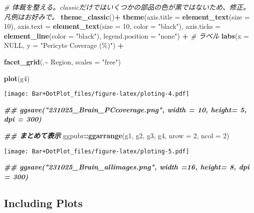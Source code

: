 \documentclass[
  a4paper,
  number-of-lines=30,
  textwidth=40zw]{bxjsarticle}
\newenvironment{Shaded}{\begin{snugshade}}{\end{snugshade}}
\newcommand{\AttributeTok}[1]{\textcolor[rgb]{0.13,0.29,0.53}{#1}}
\newcommand{\CommentTok}[1]{\textcolor[rgb]{0.56,0.35,0.01}{\textit{#1}}}
\newcommand{\ConstantTok}[1]{\textcolor[rgb]{0.56,0.35,0.01}{#1}}
\newcommand{\DecValTok}[1]{\textcolor[rgb]{0.00,0.00,0.81}{#1}}
\newcommand{\DocumentationTok}[1]{\textcolor[rgb]{0.56,0.35,0.01}{\textbf{\textit{#1}}}}
\newcommand{\FunctionTok}[1]{\textcolor[rgb]{0.13,0.29,0.53}{\textbf{#1}}}
\newcommand{\NormalTok}[1]{#1}
\newcommand{\SpecialCharTok}[1]{\textcolor[rgb]{0.81,0.36,0.00}{\textbf{#1}}}
\newcommand{\StringTok}[1]{\textcolor[rgb]{0.31,0.60,0.02}{#1}}
\begin{document}
\begin{Shaded}
\begin{Highlighting}[]
  \CommentTok{\# 体裁を整える。classicだけではいくつかの部品の色が黒ではないため、修正。凡例はお好みで。}
  \FunctionTok{theme\_classic}\NormalTok{()}\SpecialCharTok{+} 
  \FunctionTok{theme}\NormalTok{(}\AttributeTok{axis.title =} \FunctionTok{element\_text}\NormalTok{(}\AttributeTok{size =} \DecValTok{10}\NormalTok{),}
        \AttributeTok{axis.text =} \FunctionTok{element\_text}\NormalTok{(}\AttributeTok{size =} \DecValTok{10}\NormalTok{, }\AttributeTok{color =} \StringTok{"black"}\NormalTok{),}
        \AttributeTok{axis.ticks =} \FunctionTok{element\_line}\NormalTok{(}\AttributeTok{color =} \StringTok{"black"}\NormalTok{),}
        \AttributeTok{legend.position =} \StringTok{"none"}\NormalTok{) }\SpecialCharTok{+}
  \CommentTok{\# ラベル}
  \FunctionTok{labs}\NormalTok{(}\AttributeTok{x =} \ConstantTok{NULL}\NormalTok{, }\AttributeTok{y =} \StringTok{"Pericyte Coverage (\%)"}\NormalTok{) }\SpecialCharTok{+} 
  
  \FunctionTok{facet\_grid}\NormalTok{(.}\SpecialCharTok{\textasciitilde{}}\NormalTok{ Region, }\AttributeTok{scales =} \StringTok{"free"}\NormalTok{)}

  \FunctionTok{plot}\NormalTok{(g4)}
\end{Highlighting}
\end{Shaded}

\texttt{[image: Bar+DotPlot\_files/figure-latex/ploting-4.pdf]}

\begin{Shaded}
\begin{Highlighting}[]
\DocumentationTok{\#\#    ggsave("231025\_Brain\_PCcoverage.png", width = 10, height= 5, dpi = 300)}
  

\DocumentationTok{\#\# まとめて表示}
\NormalTok{ggpubr}\SpecialCharTok{::}\FunctionTok{ggarrange}\NormalTok{(g1, g2, g3, g4, }\AttributeTok{nrow =} \DecValTok{2}\NormalTok{, }\AttributeTok{ncol =} \DecValTok{2}\NormalTok{)}
\end{Highlighting}
\end{Shaded}

\texttt{[image: Bar+DotPlot\_files/figure-latex/ploting-5.pdf]}

\begin{Shaded}
\begin{Highlighting}[]
\DocumentationTok{\#\#  ggsave("231025\_Brain\_allimages.png", width =16, height= 8, dpi = 300)}
\end{Highlighting}
\end{Shaded}

\hypertarget{including-plots}{%
\subsection{Including Plots}\label{including-plots}}
\end{document}

